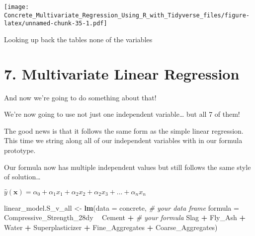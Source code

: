 \documentclass[]{article}
\newenvironment{Shaded}{\begin{snugshade}}{\end{snugshade}}
\newcommand{\CommentTok}[1]{\textcolor[rgb]{0.56,0.35,0.01}{\textit{#1}}}
\newcommand{\DataTypeTok}[1]{\textcolor[rgb]{0.13,0.29,0.53}{#1}}
\newcommand{\KeywordTok}[1]{\textcolor[rgb]{0.13,0.29,0.53}{\textbf{#1}}}
\newcommand{\NormalTok}[1]{#1}
\newcommand{\OperatorTok}[1]{\textcolor[rgb]{0.81,0.36,0.00}{\textbf{#1}}}
\newcommand{\StringTok}[1]{\textcolor[rgb]{0.31,0.60,0.02}{#1}}
\begin{document}
\texttt{[image: Concrete\_Multivariate\_Regression\_Using\_R\_with\_Tidyverse\_files/figure-latex/unnamed-chunk-35-1.pdf]}

Looking up back the tables none of the variables

\hypertarget{multivariate-linear-regression}{%
\section{7. Multivariate Linear
Regression}\label{multivariate-linear-regression}}

And now we're going to do something about that!

We're now going to use not just one independent variable\ldots{} but all
7 of them!

The good news is that it follows the same form as the simple linear
regression. This time we string along all of our independent variables
with in our formula prototype.

Our formula now has multiple independent values but still follows the
same style of solution\ldots{}

\(\widehat{y}(\mathbf{x}) = {\alpha_0}+{\alpha_1} x_1 + {\alpha_2} x_2 + {\alpha_2} x_3 + ... +{\alpha_n} x_n\)

\begin{Shaded}
\begin{Highlighting}[]
\NormalTok{linear_model.S_v_all <-}\StringTok{ }\KeywordTok{lm}\NormalTok{(}\DataTypeTok{data    =}\NormalTok{ concrete,                             }\CommentTok{# your data frame}
                           \DataTypeTok{formula =}\NormalTok{ Compressive_Strength_28dy }\OperatorTok{~}\StringTok{ }\NormalTok{Cement }\OperatorTok{+}\StringTok{  }\CommentTok{# your formula}
\StringTok{                                                                 }\NormalTok{Slag }\OperatorTok{+}
\StringTok{                                                                 }\NormalTok{Fly_Ash }\OperatorTok{+}
\StringTok{                                                                 }\NormalTok{Water }\OperatorTok{+}
\StringTok{                                                                 }\NormalTok{Superplasticizer }\OperatorTok{+}
\StringTok{                                                                 }\NormalTok{Fine_Aggregates }\OperatorTok{+}
\StringTok{                                                                 }\NormalTok{Coarse_Aggregates)  }
\end{Highlighting}
\end{Shaded}
\end{document}
